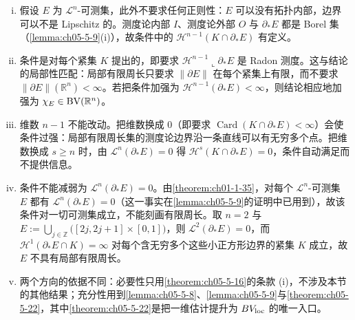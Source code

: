 \documentclass[../../main.tex]{subfiles}%
\begin{document}
\begin{remark}\label{remark:ch05-thm-5-23-条件}
\begin{enumerate}[(i)]
\item 假设 $E$ 为 $\mathcal{L}^n$-可测集，此外不要求任何正则性：$E$ 可以没有拓扑内部，边界可以不是 Lipschitz 的。测度论内部 $I$、测度论外部 $O$ 与 $\partial_*E$ 都是 Borel 集（\cref{lemma:ch05-5-9}(i)），故条件中的 $\mathcal{H}^{n-1}(K\cap\partial_*E)$ 有定义。%
\item 条件是对每个紧集 $K$ 提出的，即要求 $\mathcal{H}^{n-1}\llcorner\partial_*E$ 是 Radon 测度。这与结论的局部性匹配：局部有限周长只要求 $\lVert\partial E\rVert$ 在每个紧集上有限，而不要求 $\lVert\partial E\rVert(\mathbb{R}^n)<\infty$。若把条件加强为 $\mathcal{H}^{n-1}(\partial_*E)<\infty$，则结论相应地加强为 $\chi_E\in\mathrm{BV}(\mathbb{R}^n)$。
\item 维数 $n-1$ 不能改动。把维数换成 $0$（即要求 $\operatorname{Card}(K\cap\partial_*E)<\infty$）会使条件过强：局部有限周长集的测度论边界沿一条直线可以有无穷多个点。把维数换成 $s\geqslant n$ 时，由 $\mathcal{L}^n(\partial_*E)=0$ 得 $\mathcal{H}^s(K\cap\partial_*E)=0$，条件自动满足而不提供信息。
\item 条件不能减弱为 $\mathcal{L}^n(\partial_*E)=0$。由\cref{theorem:ch01-1-35}，对每个 $\mathcal{L}^n$-可测集 $E$ 都有 $\mathcal{L}^n(\partial_*E)=0$（这一事实在\cref{lemma:ch05-5-9}的证明中已用到），故该条件对一切可测集成立，不能刻画有限周长。取 $n=2$ 与 $E:=\bigcup_{j\in\mathbb{Z}}\bigl([2j,2j+1]\times[0,1]\bigr)$，则 $\mathcal{L}^2(\partial_*E)=0$，而 $\mathcal{H}^1(\partial_*E\cap K)=\infty$ 对每个含无穷多个这些小正方形边界的紧集 $K$ 成立，故 $E$ 不具有局部有限周长。%
\item 两个方向的依据不同：必要性只用\cref{theorem:ch05-5-16}的条款 (i)，不涉及本节的其他结果；充分性用到\cref{lemma:ch05-5-8}、\cref{lemma:ch05-5-9}与\cref{theorem:ch05-5-22}，其中\cref{theorem:ch05-5-22}是把一维估计提升为 $BV_{\mathrm{loc}}$ 的唯一入口。%
\end{enumerate}
\end{remark}
\end{document}
